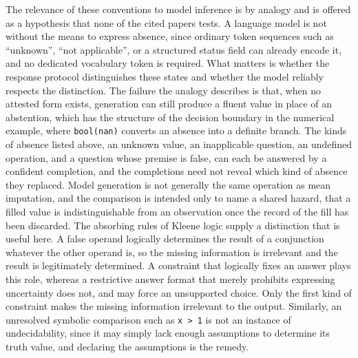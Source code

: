 \documentclass[11pt]{article}
\theoremstyle{remark}
\begin{document}
The relevance of these conventions to model inference is by analogy and is offered as a hypothesis that none of the cited papers tests. A language model is not without the means to express absence, since ordinary token sequences such as ``unknown'', ``not applicable'', or a structured status field can already encode it, and no dedicated vocabulary token is required. What matters is whether the response protocol distinguishes these states and whether the model reliably respects the distinction. The failure the analogy describes is that, when no attested form exists, generation can still produce a fluent value in place of an abstention, which has the structure of the decision boundary in the numerical example, where \verb|bool(nan)| converts an absence into a definite branch. The kinds of absence listed above, an unknown value, an inapplicable question, an undefined operation, and a question whose premise is false, can each be answered by a confident completion, and the completions need not reveal which kind of absence they replaced. Model generation is not generally the same operation as mean imputation, and the comparison is intended only to name a shared hazard, that a filled value is indistinguishable from an observation once the record of the fill has been discarded. The absorbing rules of Kleene logic supply a distinction that is useful here. A false operand logically determines the result of a conjunction whatever the other operand is, so the missing information is irrelevant and the result is legitimately determined. A constraint that logically fixes an answer plays this role, whereas a restrictive answer format that merely prohibits expressing uncertainty does not, and may force an unsupported choice. Only the first kind of constraint makes the missing information irrelevant to the output. Similarly, an unresolved symbolic comparison such as \verb|x > 1| is not an instance of undecidability, since it may simply lack enough assumptions to determine its truth value, and declaring the assumptions is the remedy.
\end{document}
